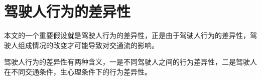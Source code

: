%


%



\section{驾驶人行为的差异性}
本文的一个重要假设就是驾驶人行为的差异性，正是由于驾驶人行为的差异性，驾驶人组成情况的改变才可能导致对交通流的影响。

驾驶人行为的差异性有两种含义，一是不同驾驶人之间的行为差异性，二是驾驶人在不同交通条件，生心理条件下的行为差异性。

